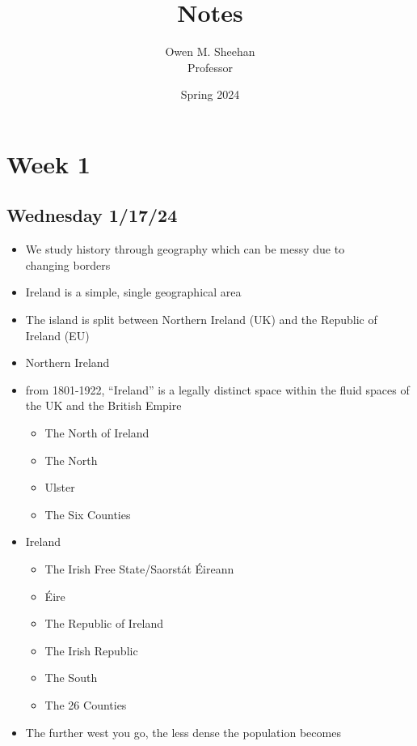 \documentclass[12pt]{article}
\title{\class{} Notes}
\author{Owen M. Sheehan\\Professor \prof{}}
\date{Spring 2024}
\begin{document}
\maketitle
\tableofcontents
\newpage
    \section{Week 1}
        \subsection{Wednesday 1/17/24}
            \bigskip
            \begin{itemize}
                \item We study history through geography which can be messy due to \\changing borders
                \item Ireland is a simple, single geographical area
                \item The island is split between Northern Ireland (UK) and the Republic of Ireland (EU)
                \item Northern Ireland
                \item from 1801-1922, ``Ireland'' is a legally distinct space within the fluid spaces of the UK and the British Empire
                \begin{itemize}
                    \item The North of Ireland
                    \item The North
                    \item Ulster
                    \item The Six Counties
                \end{itemize}
                \item Ireland
                \begin{itemize}
                    \item The Irish Free State/Saorstát Éireann
                    \item Éire
                    \item The Republic of Ireland
                    \item The Irish Republic
                    \item The South
                    \item The 26 Counties
                \end{itemize}
                \item The further west you go, the less dense the population becomes

\end{itemize}
\end{document}
